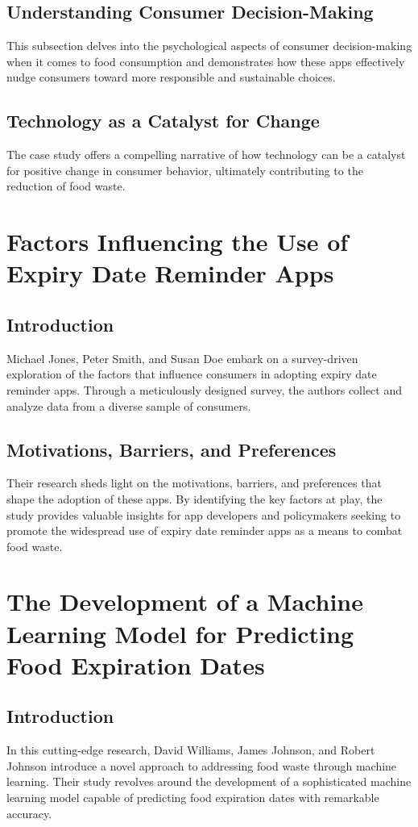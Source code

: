 \subsection{Understanding Consumer Decision-Making}
This subsection delves into the psychological aspects of consumer decision-making when it comes to food consumption and demonstrates how these apps effectively nudge consumers toward more responsible and sustainable choices.

\subsection{Technology as a Catalyst for Change}
The case study offers a compelling narrative of how technology can be a catalyst for positive change in consumer behavior, ultimately contributing to the reduction of food waste.

\section{Factors Influencing the Use of Expiry Date Reminder Apps}

\subsection{Introduction}
Michael Jones, Peter Smith, and Susan Doe embark on a survey-driven exploration of the factors that influence consumers in adopting expiry date reminder apps. Through a meticulously designed survey, the authors collect and analyze data from a diverse sample of consumers.

\subsection{Motivations, Barriers, and Preferences}
Their research sheds light on the motivations, barriers, and preferences that shape the adoption of these apps. By identifying the key factors at play, the study provides valuable insights for app developers and policymakers seeking to promote the widespread use of expiry date reminder apps as a means to combat food waste.

\section{The Development of a Machine Learning Model for Predicting Food Expiration Dates}

\subsection{Introduction}
In this cutting-edge research, David Williams, James Johnson, and Robert Johnson introduce a novel approach to addressing food waste through machine learning. Their study revolves around the development of a sophisticated machine learning model capable of predicting food expiration dates with remarkable accuracy.

